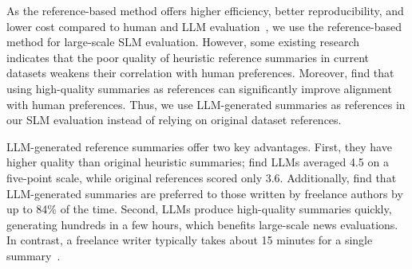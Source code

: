 

As the reference-based method offers higher efficiency, better reproducibility, and lower cost compared to human and LLM evaluation~\cite{fabbri2021summeval,zhang2024benchmarking}, we use the reference-based method for large-scale SLM evaluation. However, some existing research~\cite{how_well,fabbri2021summeval} indicates that the poor quality of heuristic reference summaries in current datasets weakens their correlation with human preferences. Moreover, \citet{zhang2024benchmarking} find that using high-quality summaries as references can significantly improve alignment with human preferences. Thus, we use LLM-generated summaries as references in our SLM evaluation instead of relying on original dataset references. 

LLM-generated reference summaries offer two key advantages.
First, they have higher quality than original heuristic summaries; \citet{zhang2024benchmarking} find LLMs averaged 4.5 on a five-point scale, while original references scored only 3.6. Additionally, \citet{dead_summarization} find that LLM-generated summaries are preferred to those written by freelance authors by up to 84\% of the time. 
Second, LLMs produce high-quality summaries quickly, generating hundreds in a few hours, which benefits large-scale news evaluations. In contrast, a freelance writer typically takes about 15 minutes for a single summary~\cite{zhang2024benchmarking}. 




